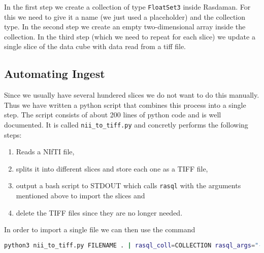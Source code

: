 In the first step we create a collection of type \lstinline{FloatSet3} inside Rasdaman. For this we need to give it a name (we just used a placeholder) and the collection type.
In the second step we create an empty two-dimensional array inside the collection.
In the third step (which we need to repeat for each slice) we update a single slice of the data cube with data read from a tiff file.

\subsection{Automating Ingest}

Since we usually have several hundered slices we do not want to do this manually. Thus we have written a python script that combines this process into a single step. The script consists of about 200 lines of python code and is well documented. It is called \lstinline{nii_to_tiff.py} and concretly performs the following steps: 

\begin{enumerate}
  \item Reads a NIfTI file,
  \item splits it into different slices and store each one as a TIFF file,
  \item output a bash script to STDOUT which calls \lstinline{rasql} with the arguments mentioned above to import the slices and
  \item delete the TIFF files since they are no longer needed.
\end{enumerate}

In order to import a single file we can then use the command
\begin{lstlisting}[showstringspaces=false,morekeywords={NAME},language=Bash]
python3 nii_to_tiff.py FILENAME . | rasql_coll=COLLECTION rasql_args="--quiet" bash
\end{lstlisting}
